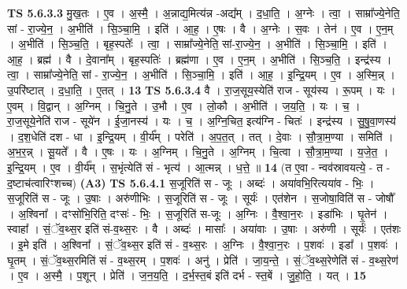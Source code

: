 \documentclass[17pt]{extarticle}
\begin{document}
                  \newline
                                \textbf{ TS 5.6.3.3} \newline
                  मु॒ख॒तः । ए॒व । अ॒स्मै॒ । अ॒न्नाद्य॒मित्य॑न्न -अद्य᳚म् । द॒धा॒ति॒ । अ॒ग्नेः । त्वा॒ । साम्रा᳚ज्ये॒नेति॒ सां - रा॒ज्ये॒न॒ । अ॒भीति॑ । सि॒ञ्चा॒मि॒ । इति॑ । आ॒ह॒ । ए॒षः । वै । अ॒ग्नेः । स॒वः । तेन॑ । ए॒व । ए॒न॒म् । अ॒भीति॑ । सि॒ञ्च॒ति॒ । बृह॒स्पतेः᳚ । त्वा॒ । साम्रा᳚ज्ये॒नेति॒ सां-रा॒ज्ये॒न॒ । अ॒भीति॑ । सि॒ञ्चा॒मि॒ । इति॑ । आ॒ह॒ । ब्रह्म॑ । वै । दे॒वाना᳚म् । बृह॒स्पतिः॑ । ब्रह्म॑णा । ए॒व । ए॒न॒म् । अ॒भीति॑ । सि॒ञ्च॒ति॒ । इन्द्र॑स्य । त्वा॒ । साम्रा᳚ज्ये॒नेति॒ सां - रा॒ज्ये॒न॒ । अ॒भीति॑ । सि॒ञ्चा॒मि॒ । इति॑ । आ॒ह॒ । इ॒न्द्रि॒यम् । ए॒व । अ॒स्मि॒न्न् । उ॒परि॑ष्टात् । द॒धा॒ति॒ । ए॒तत् । \textbf{  13} \newline
                  \newline
                                \textbf{ TS 5.6.3.4} \newline
                  वै । रा॒ज॒सूय॒स्येति॑ राज - सूय॑स्य । रू॒पम् । यः । ए॒वम् । वि॒द्वान् । अ॒ग्निम् । चि॒नु॒ते । उ॒भौ । ए॒व ।   लो॒कौ । अ॒भीति॑ । ज॒य॒ति॒ । यः । च॒ । रा॒ज॒सूये॒नेति॑ राज - सूये॑न । ई॒जा॒नस्य॑ । यः । च॒ । अ॒ग्नि॒चित॒ इत्य॑ग्नि - चितः॑ । इन्द्र॑स्य । सु॒षु॒वा॒णस्य॑ । द॒श॒धेति॑ दश - धा । इ॒न्द्रि॒यम् । वी॒र्य᳚म् । परेति॑ । अ॒प॒त॒त् । तत् । दे॒वाः । सौ॒त्रा॒म॒ण्या । समिति॑ । अ॒भ॒र॒न्न् । सू॒यते᳚ । वै । ए॒षः । यः । अ॒ग्निम् । चि॒नु॒ते । अ॒ग्निम् । चि॒त्वा । सौ॒त्रा॒म॒ण्या । य॒जे॒त॒ । इ॒न्द्रि॒यम् । ए॒व । वी॒र्य᳚म् । स॒भृंत्येति॑ सं - भृत्य॑ । आ॒त्मन्न् । ध॒त्ते॒ ॥ \textbf{  14} \newline
                  \newline
                      (त ए॒वा - न्वव॑स्रावयत्ये॒ - त - द॒ष्टाच॑त्वारिꣳशच्च)  \textbf{(A3)} \newline \newline
                                \textbf{ TS 5.6.4.1} \newline
                  स॒जूरिति॑ स - जूः । अब्दः॑ । अया॑वभि॒रित्यया॑व - भिः॒ । स॒जूरिति॑ स - जूः । उ॒षाः । अरु॑णीभिः । स॒जूरिति॑ स - जूः । सूर्यः॑ । एत॑शेन । स॒जोषा॒विति॑ स - जोषौ᳚ । अ॒श्विना᳚ । दꣳसो॑भि॒रिति॒ दꣳसः॑ - भिः॒ । स॒जूरिति॑ स-जूः । अ॒ग्निः । वै॒श्वा॒न॒रः । इडा॑भिः । घृ॒तेन॑ । स्वाहा᳚ । सं॒ॅव॒थ्स॒र इति॑ सं-व॒थ्स॒रः । वै । अब्दः॑ । मासाः᳚ । अया॑वाः । उ॒षाः । अरु॑णी । सूर्यः॑ । एत॑शः । इ॒मे इति॑ । अ॒श्विना᳚ । सं॒ॅव॒थ्स॒र इति॑ सं - व॒थ्स॒रः । अ॒ग्निः । वै॒श्वा॒न॒रः । प॒शवः॑ । इडा᳚ । प॒शवः॑ । घृ॒तम् । सं॒ॅव॒थ्स॒रमिति॑ सं - व॒थ्स॒रम् । प॒शवः॑ । अनु॑ । प्रेति॑ । जा॒य॒न्ते॒ । सं॒ॅव॒थ्स॒रेणेति॑ सं - व॒थ्स॒रेण॑ । ए॒व । अ॒स्मै॒ । प॒शून् । प्रेति॑ । ज॒न॒य॒ति॒ । द॒र्भ॒स्त॒बं इति॑ दर्भ - स्त॒बें । जु॒हो॒ति॒ । यत् । \textbf{  15} \newline
\end{document}
